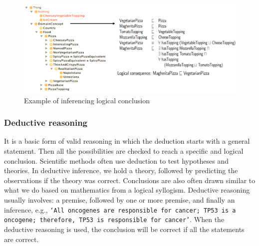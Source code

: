 \begin{figure}[h]
	\centering
	\includegraphics[scale=0.8]{images/reasoning.png}
	\caption{Example of inferencing logical conclusion} 
	\label{fig:pizza1}
	\vspace{-2mm}
\end{figure}

\subsubsection{Deductive reasoning} 
It is a basic form of valid reasoning in which the deduction starts with a general statement. Then all the possibilities are checked to reach a specific and logical conclusion. Scientific methods often use deduction to test hypotheses and theories. In deductive inference, we hold a theory, followed by predicting the observations if the theory was correct. Conclusions are also often drawn similar to what we do based on mathematics from a logical syllogism. Deductive reasoning usually involves: a premise, followed by one or more premise, and finally an inference, e.g., \texttt{`All oncogenes are responsible for cancer; TP53 is a oncogene; therefore, TP53 is responsible for cancer'}. When the deductive reasoning is used, the conclusion will be correct if all the statements are correct. 

